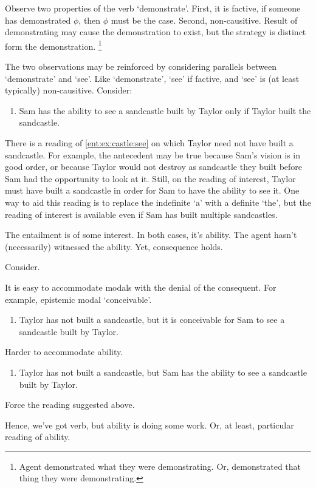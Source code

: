 \begin{note}
  Observe two properties of the verb `demonstrate'.
  First, it is factive, if someone has demonstrated \(\phi\), then \(\phi\) must be the case.
  Second, non-causitive.
  Result of demonstrating may cause the demonstration to exist, but the strategy is distinct form the demonstration.\nolinebreak
  \footnote{
    Agent demonstrated what they were demonstrating.
    Or, demonstrated that thing they were demonstrating.
  }

  The two observations may be reinforced by considering parallels between `demonstrate' and `see'.
  Like `demonstrate', `see' if factive, and `see' is (at least typically) non-causitive.
  Consider:
  \begin{enumerate}
  \item\label{ent:ex:castle:see} Sam has the ability to see a sandcastle built by Taylor only if Taylor built the sandcastle.
  \end{enumerate}
  There is a reading of \ref{ent:ex:castle:see} on which Taylor need not have built a sandcastle.
  For example, the antecedent may be true because Sam's vision is in good order, or because Taylor would not destroy as sandcastle they built before Sam had the opportunity to look at it.
  Still, on the reading of interest, Taylor must have built a sandcastle in order for Sam to have the ability to see it.
  One way to aid this reading is to replace the indefinite `a' with a definite `the', but the reading of interest is available even if Sam has built multiple sandcastles.
\end{note}

\begin{note}
  The entailment is of some interest.
  In both cases, it's ability.
  The agent hasn't (necessarily) witnessed the ability.
  Yet, consequence holds.

  Consider.

  It is easy to accommodate modals with the denial of the consequent.
  For example, epistemic modal `conceivable'.
  \begin{enumerate}
  \item Taylor has not built a sandcastle, but it is conceivable for Sam to see a sandcastle built by Taylor.
  \end{enumerate}

  Harder to accommodate ability.
  \begin{enumerate}
  \item Taylor has not built a sandcastle, but Sam has the ability to see a sandcastle built by Taylor.
  \end{enumerate}
  Force the reading suggested above.

  Hence, we've got verb, but ability is doing some work.
  Or, at least, particular reading of ability.
\end{note}

